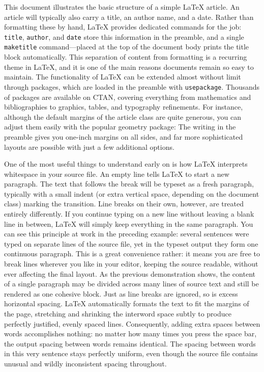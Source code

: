 \documentclass[12pt,a4paper]{article}
\begin{document}
This document illustrates the basic structure of a simple \LaTeX{} article. 
An article will typically also carry a title, an author name, and a date. Rather than formatting these by hand, \LaTeX{} provides dedicated commands for the job: \texttt{title}, \texttt{author}, and \texttt{date} store this information in the preamble, and a single \texttt{maketitle} command—placed at the top of the document body prints the title block automatically. This separation of content from formatting is a recurring theme in \LaTeX{}, and it is one of the main reasons documents remain so easy to maintain.
The functionality of \LaTeX{} can be extended almost without limit through packages, which are loaded in the preamble with \texttt{usepackage}. Thousands of packages are available on CTAN, covering everything from mathematics and bibliographies to graphics, tables, and typography refinements.
For instance, although the default margins of the article class are quite generous, you can adjust them easily with the popular geometry package: The writing in the preamble gives you one-inch margins on all sides, and far more sophisticated layouts are possible with just a few additional options.

One of the most useful things to understand early on is how \LaTeX{} interprets whitespace in your source file. An empty line tells \LaTeX{} to start a new paragraph. The text that follows the break will be typeset as a fresh paragraph, typically with a small indent (or extra vertical space, depending on the document class) marking the transition.
Line breaks on their own, however, are treated entirely differently. If you continue typing on a new line without leaving a blank line in between, \LaTeX{} will simply keep everything in the same paragraph. You can see this principle at work in the preceding example:
several sentences were typed on separate lines of the source file, yet in the typeset
output they form one continuous paragraph.
This is a great convenience rather: it means you are free to break lines wherever you like in your editor, keeping the source readable, without ever affecting the final layout. As the previous demonstration shows, the content of a single paragraph may be divided across many lines of source text and still be rendered as one cohesive block.
Just as line breaks are ignored, so is excess horizontal spacing. \LaTeX{} automatically formats the text to fit the margins of the page, stretching and shrinking the interword space subtly to produce perfectly justified, evenly spaced lines. Consequently, adding        extra         spaces      between         words
accomplishes      nothing:         no        matter        how         many      times       you       press  the space bar, the output spacing between words remains identical. The spacing between words in this very sentence stays perfectly uniform, even though the source file contains unusual and wildly inconsistent spacing throughout.
\end{document}
